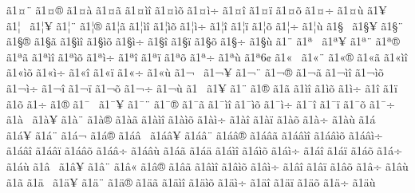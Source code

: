 {^^e31^^a4^^a8
^^e31^^a4^^ae
^^e31^^a4^^e0
^^e31^^a4^^e3
^^e31^^a4^^ec^^ee
^^e31^^a4^^ec^^f5
^^e31^^a4^^ec^^f7
^^e31^^a4^^ee
^^e31^^a4^^ef
^^e31^^a4^^f5
^^e31^^a4^^f7
^^e31^^a4^^f9
^^e31^^a5
^^e31^^a6^^a0
^^e31^^a6^^a5
^^e31^^a6^^a8
^^e31^^a6^^ae
^^e31^^a6^^e3
^^e31^^a6^^ec^^ee
^^e31^^a6^^ec^^f5
^^e31^^a6^^ec^^f7
^^e31^^a6^^ee
^^e31^^a6^^ef
^^e31^^a6^^f5
^^e31^^a6^^f7
^^e31^^a6^^f9
^^e31^^a7^^a0
^^e31^^a7^^a5
^^e31^^a7^^a8
^^e31^^a7^^ae
^^e31^^a7^^e3
^^e31^^a7^^ec^^ee
^^e31^^a7^^ec^^f5
^^e31^^a7^^ec^^f7
^^e31^^a7^^ee
^^e31^^a7^^ef
^^e31^^a7^^f5
^^e31^^a7^^f7
^^e31^^a7^^f9
^^e31^^a8
^^e31^^aa^^a0
^^e31^^aa^^a5
^^e31^^aa^^a8
^^e31^^aa^^ae
^^e31^^aa^^e3
^^e31^^aa^^ec^^ee
^^e31^^aa^^ec^^f5
^^e31^^aa^^ec^^f7
^^e31^^aa^^ee
^^e31^^aa^^ef
^^e31^^aa^^f5
^^e31^^aa^^f7
^^e31^^aa^^f9
^^e31^^aa6^^a2
^^e31^^ab^^a0
^^e31^^ab^^a8
^^e31^^ab^^ae
^^e31^^ab^^e3
^^e31^^ab^^ec^^ee
^^e31^^ab^^ec^^f5
^^e31^^ab^^ec^^f7
^^e31^^ab^^ee
^^e31^^ab^^ef
^^e31^^ab^^f7
^^e31^^ab^^f9
^^e31^^ac^^a0
^^e31^^ac^^a5
^^e31^^ac^^a8
^^e31^^ac^^ae
^^e31^^ac^^e3
^^e31^^ac^^ec^^ee
^^e31^^ac^^ec^^f5
^^e31^^ac^^ec^^f7
^^e31^^ac^^ee
^^e31^^ac^^ef
^^e31^^ac^^f5
^^e31^^ac^^f7
^^e31^^ac^^f9
^^e31^^ad^^a0
^^e31^^ad^^a5
^^e31^^ad^^a8
^^e31^^ad^^ae
^^e31^^ad^^e3
^^e31^^ad^^ec^^ee
^^e31^^ad^^ec^^f5
^^e31^^ad^^ec^^f7
^^e31^^ad^^ee
^^e31^^ad^^ef
^^e31^^ad^^f5
^^e31^^ad^^f7
^^e31^^ae
^^e31^^af^^a0
^^e31^^af^^a5
^^e31^^af^^a8
^^e31^^af^^ae
^^e31^^af^^e3
^^e31^^af^^ec^^ee
^^e31^^af^^ec^^f5
^^e31^^af^^ec^^f7
^^e31^^af^^ee
^^e31^^af^^ef
^^e31^^af^^f5
^^e31^^af^^f7
^^e31^^e0^^a0
^^e31^^e0^^a5
^^e31^^e0^^a8
^^e31^^e0^^ae
^^e31^^e0^^e3
^^e31^^e0^^ec^^ee
^^e31^^e0^^ec^^f5
^^e31^^e0^^ec^^f7
^^e31^^e0^^ee
^^e31^^e0^^ef
^^e31^^e0^^f5
^^e31^^e0^^f7
^^e31^^e0^^f9
^^e31^^e1^^a0
^^e31^^e1^^a5
^^e31^^e1^^a8
^^e31^^e1^^ac
^^e31^^e1^^ae
^^e31^^e1^^e2^^a0
^^e31^^e1^^e2^^a5
^^e31^^e1^^e2^^a8
^^e31^^e1^^e2^^ae
^^e31^^e1^^e2^^e3
^^e31^^e1^^e2^^ec^^ee
^^e31^^e1^^e2^^ec^^f5
^^e31^^e1^^e2^^ec^^f7
^^e31^^e1^^e2^^ee
^^e31^^e1^^e2^^ef
^^e31^^e1^^e2^^f5
^^e31^^e1^^e2^^f7
^^e31^^e1^^e2^^f9
^^e31^^e1^^e3
^^e31^^e1^^e4
^^e31^^e1^^ec^^ee
^^e31^^e1^^ec^^f5
^^e31^^e1^^ec^^f7
^^e31^^e1^^ee
^^e31^^e1^^ef
^^e31^^e1^^f5
^^e31^^e1^^f7
^^e31^^e1^^f9
^^e31^^e2^^a0
^^e31^^e2^^a5
^^e31^^e2^^a8
^^e31^^e2^^ab
^^e31^^e2^^ae
^^e31^^e2^^e3
^^e31^^e2^^ec^^ee
^^e31^^e2^^ec^^f5
^^e31^^e2^^ec^^f7
^^e31^^e2^^ee
^^e31^^e2^^ef
^^e31^^e2^^f5
^^e31^^e2^^f7
^^e31^^e2^^f9
^^e31^^e3
^^e31^^e4^^a0
^^e31^^e4^^a5
^^e31^^e4^^a8
^^e31^^e4^^ae
^^e31^^e4^^e3
^^e31^^e4^^ec^^ee
^^e31^^e4^^ec^^f5
^^e31^^e4^^ec^^f7
^^e31^^e4^^ee
^^e31^^e4^^ef
^^e31^^e4^^f5
^^e31^^e4^^f7
^^e31^^e4^^f9
}
